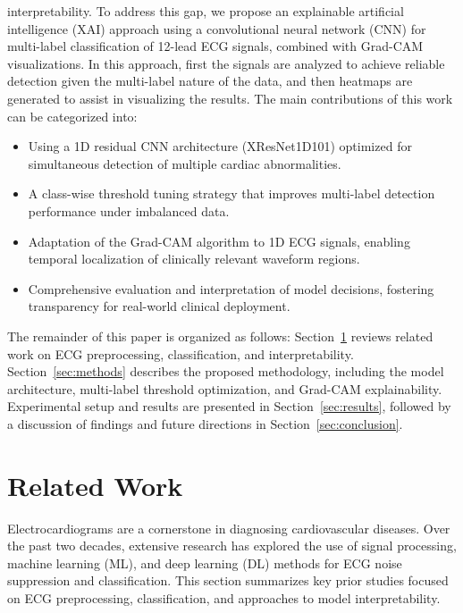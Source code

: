 \documentclass[a4paper,fleqn]{cas-dc}
\begin{document}
interpretability. To address this gap, we propose an explainable artificial intelligence (XAI) approach using a convolutional neural network (CNN) for multi-label classification of 12-lead ECG signals, combined with Grad-CAM visualizations. In this approach, first the signals are analyzed to achieve reliable detection given the multi-label nature of the data, and then heatmaps are generated to assist in visualizing the results. The main contributions of this work can be categorized into:
\begin{itemize}
    \item Using a 1D residual CNN architecture (XResNet1D101) optimized for simultaneous detection of multiple cardiac abnormalities.
    \item A class-wise threshold tuning strategy that improves multi-label detection performance under imbalanced data.
    \item Adaptation of the Grad-CAM algorithm to 1D ECG signals, enabling temporal localization of clinically relevant waveform regions.
    \item Comprehensive evaluation and interpretation of model decisions, fostering transparency for real-world clinical deployment.
\end{itemize}
The remainder of this paper is organized as follows: Section~\ref{sec:related} reviews related work on ECG preprocessing, classification, and interpretability. Section~\ref{sec:methods} describes the proposed methodology, including the model architecture, multi-label threshold optimization, and Grad-CAM explainability. Experimental setup and results are presented in Section~\ref{sec:results}, followed by a discussion of findings and future directions in Section~\ref{sec:conclusion}.

\section{Related Work}
\label{sec:related}
Electrocardiograms are a cornerstone in diagnosing cardiovascular diseases. Over the past two decades, extensive research has explored the use of signal processing, machine learning (ML), and deep learning (DL) methods for ECG noise suppression and classification. This section summarizes key prior studies focused on ECG preprocessing, classification, and approaches to model interpretability.
\end{document}
